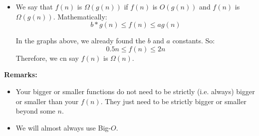 \documentclass[letterpaper]{article}
\begin{document}
\begin{itemize}
    \item We say that $f(n)$ is $\Omega(g(n))$ if $f(n)$ is $O(g(n))$ and $f(n)$ is $\Omega(g(n))$. Mathematically: 
    \[b * g(n) \leq f(n) \leq a g(n)\]
    
    In the graphs above, we already found the $b$ and $a$ constants. So:
    \[0.5n \leq f(n) \leq 2n\]
    Therefore, we cn say $f(n)$ is $\Omega(n)$.
\end{itemize}

\textbf{Remarks:} 
\begin{itemize}
    \item Your bigger or smaller functions do not need to be strictly (i.e. always) bigger or smaller than your $f(n)$. They just need to be strictly bigger or smaller beyond some $n$.
    \item We will almost always use Big-$O$. 
\end{itemize}
\end{document}
